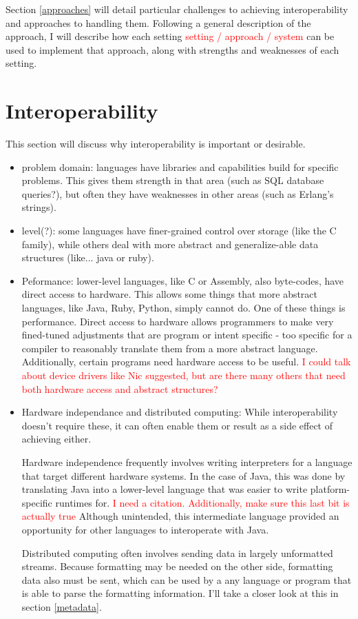 \documentclass{sig-alternate}
\newcommand{\mycomment}[1]{\textcolor{red}{#1}}
\begin{document}
Section \ref{approaches} will detail particular challenges to achieving interoperability and approaches to handling them. Following a general description of the approach, I will describe how each setting \mycomment{setting / approach / system} can be used to implement that approach, along with strengths and weaknesses of each setting.


\section{Interoperability}\label{Interop}
This section will discuss why interoperability is important or desirable.
\begin{itemize}
	\item problem domain: languages have libraries and capabilities build for specific problems. This gives them strength in that area (such as SQL database queries?), but often they have weaknesses in other areas (such as Erlang's strings).
	\item level(?): some languages have finer-grained control over storage (like the C family), while others deal with more abstract and generalize-able data structures (like... java or ruby).
	
	\item Peformance: lower-level languages, like C or Assembly, also byte-codes, have direct access to hardware. This allows some things that more abstract languages, like Java, Ruby, Python, simply cannot do. One of these things is performance. Direct access to hardware allows programmers to make very fined-tuned adjustments that are program or intent specific - too specific for a compiler to reasonably translate them from a more abstract language.
	Additionally, certain programs need hardware access to be useful. \mycomment{I could talk about device drivers like Nic suggested, but are there many others that need both hardware access and abstract structures?}
		
	\item Hardware independance and distributed computing: While interoperability doesn't require these, it can often enable them or result as a side effect of achieving either.
	
	Hardware independence frequently involves writing interpreters for a language that target different hardware systems. In the case of Java, this was done by translating Java into a lower-level language that was easier to write platform-specific runtimes for.
	\mycomment{I need a citation. Additionally, make sure this last bit is actually true}
	Although unintended, this intermediate language provided an opportunity for other languages to interoperate with Java.	
	
	Distributed computing often involves sending data in largely unformatted streams. Because formatting may be needed on the other side, formatting data also must be sent, which can be used by a any language or program that is able to parse the formatting information. I'll take a closer look at this in section \ref{metadata}.
\end{itemize}
\end{document}

